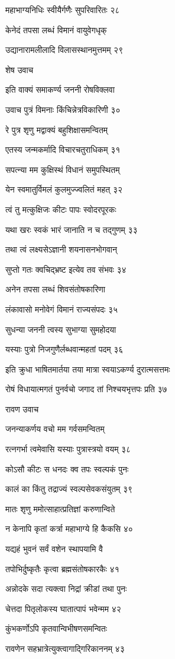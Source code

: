 महाभाग्यनिधिः स्वीयैर्गणैः सुपरिवारितः २८

केनेदं तपसा लब्धं विमानं वायुवेगधृक्

उद्यानारामलीलादि विलासस्थानमुत्तमम् २९

शेष उवाच

इति वाक्यं समाकर्ण्य जननी रोषविक्लवा

उवाच पुत्रं विमनाः किंचिन्नेत्रविकारिणी ३०

रे पुत्र शृणु मद्वाक्यं बहुशिक्षासमन्वितम्

एतस्य जन्मकर्मादि विचारचतुराधिकम् ३१

सपत्न्या मम कुक्षिस्थं विधानं समुपस्थितम्

येन स्वमातुर्विमलं कुलमुज्ज्वलितं महत् ३२

त्वं तु मत्कुक्षिजः कीटः पापः स्वोदरपूरकः

यथा खरः स्वकं भारं जानाति न च तद्गुणम् ३३

तथा त्वं लक्ष्यसेऽज्ञानी शयनासनभोगवान्

सुप्तो गतः क्वचिद्भ्रष्ट इत्येव तव संभवः ३४

अनेन तपसा लब्धं शिवसंतोषकारिणा

लंकावासो मनोवेगं विमानं राज्यसंपदः ३५

सुधन्या जननी त्वस्य सुभाग्या सुमहोदया

यस्याः पुत्रो निजगुणैर्लब्धवान्महतां पदम् ३६

इति क्रुधा भाषितमार्तया तया मात्रा स्वयाऽकर्ण्य दुरात्मसत्तमः

रोषं विधायात्मगतं पुनर्वचो जगाद तां निश्चयभृत्तपः प्रति ३७

रावण उवाच

जनन्याकर्णय वचो मम गर्वसमन्वितम्

रत्नगर्भा त्वमेवासि यस्याः पुत्रास्त्रयो वयम् ३८

कोऽसौ कीटः स धनदः क्व तपः स्वल्पकं पुनः

कालं का किंतु तद्राज्यं स्वल्पसेवकसंयुतम् ३९

मातः शृणु ममोत्साहात्प्रतिज्ञां करुणान्विते

न केनापि कृतां कर्त्रा महाभाग्ये हि कैकसि ४०

यद्यहं भुवनं सर्वं वशेन स्थापयामि वै

तपोभिर्दुष्कृतैः कृत्वा ब्रह्मसंतोषकारकैः ४१

अन्नोदके सदा त्यक्त्वा निद्रां क्रीडां तथा पुनः

चेत्तदा पितृलोकस्य घातात्पापं भवेन्मम ४२

कुंभकर्णोऽपि कृतवान्विभीषणसमन्वितः

रावणेन सहभ्रात्रेत्युक्त्वागाद्गिरिकाननम् ४३

